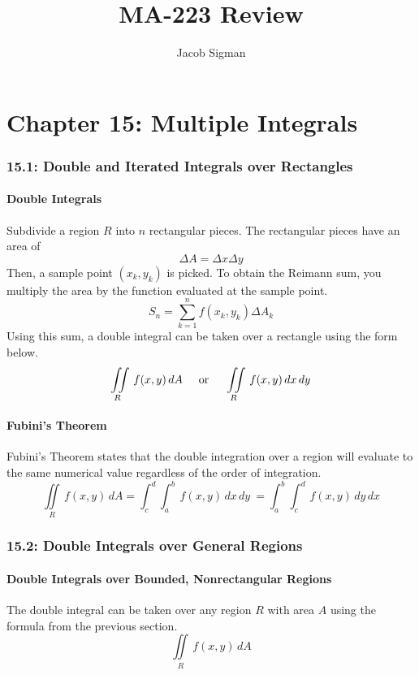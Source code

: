 \documentclass{article}
\title{MA-223 Review}
\author{Jacob Sigman}
\date{}
\begin{document}
\maketitle
\tableofcontents
\newpage
\part*{Chapter 15: Multiple Integrals}
\section*{15.1: Double and Iterated Integrals over Rectangles}
\subsection*{Double Integrals}
Subdivide a region \(R\) into \(n\) rectangular pieces. The rectangular pieces have an area of
\[\Delta A=\Delta x \Delta y\]
Then, a sample point \((x_k, y_k)\) is picked. To obtain the Reimann sum, you multiply the area by the function evaluated at the sample point.
\[S_n = \sum_{k=1}^{n}f(x_k, y_k)\Delta A_k\]
Using this sum, a double integral can be taken over a rectangle using the form below.
\[\iint\limits_{R}\,f(x, y) \,dA\hspace{5mm} \text{or}\hspace{5mm} \iint\limits_{R}\,f(x, y) \,dx\,dy\]
\subsection*{Fubini's Theorem}
Fubini's Theorem states that the double integration over a region will evaluate to the same numerical value regardless of the order of integration.
\[\iint\limits_{R}\,f(x, y) \,dA = \int_c^d\int_a^b\,f(x, y) \,dx\,dy\ = \int_a^b\int_c^d\,f(x, y) \,dy\,dx\]
\section*{15.2: Double Integrals over General Regions}
\subsection*{Double Integrals over Bounded, Nonrectangular Regions}
The double integral can be taken over any region \(R\) with area \(A\) using the formula from the previous section.
\[\iint\limits_{R}\,f(x, y) \,dA\]
\end{document}
